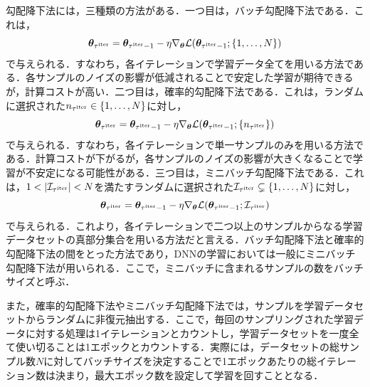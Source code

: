 \documentclass[12pt]{jarticle}
\numberwithin{equation}{section}    %
\numberwithin{figure}{section}      %
\numberwithin{table}{section}      %
\begin{document}
勾配降下法には，三種類の方法がある\cite{zhang2019gradient}．一つ目は，バッチ勾配降下法である．これは，
\begin{equation}
    \bm{\theta}_{\tau^{\text{iter}}} = \bm{\theta}_{\tau^{\text{iter}} - 1} - \eta \nabla_{\bm{\theta}} \mathcal{L}(\bm{\theta}_{\tau^{\text{iter}} - 1}; \{1, \ldots, N\})
\end{equation}
で与えられる．すなわち，各イテレーションで学習データ全てを用いる方法である．各サンプルのノイズの影響が低減されることで安定した学習が期待できるが，計算コストが高い．二つ目は，確率的勾配降下法である．これは，ランダムに選択された$n_{\tau^{\text{iter}}} \in \{1, \ldots, N\}$に対し，
\begin{equation}
    \bm{\theta}_{\tau^{\text{iter}}} = \bm{\theta}_{\tau^{\text{iter}} - 1} - \eta \nabla_{\bm{\theta}} \mathcal{L}(\bm{\theta}_{\tau^{\text{iter}} - 1}; \{n_{\tau^{\text{iter}}}\})
\end{equation}
で与えられる．すなわち，各イテレーションで単一サンプルのみを用いる方法である．計算コストが下がるが，各サンプルのノイズの影響が大きくなることで学習が不安定になる可能性がある．三つ目は，ミニバッチ勾配降下法である．これは，$1 < |\mathcal{I}_{\tau^{\text{iter}}}| < N$を満たすランダムに選択された$\mathcal{I}_{\tau^{\text{iter}}} \subsetneq \{1, \ldots, N\}$に対し，
\begin{equation}
    \bm{\theta}_{\tau^{\text{iter}}} = \bm{\theta}_{\tau^{\text{iter}} - 1} - \eta \nabla_{\bm{\theta}} \mathcal{L}(\bm{\theta}_{\tau^{\text{iter}} - 1}; \mathcal{I}_{\tau^{\text{iter}}})
\end{equation}
で与えられる．これより，各イテレーションで二つ以上のサンプルからなる学習データセットの真部分集合を用いる方法だと言える．バッチ勾配降下法と確率的勾配降下法の間をとった方法であり，DNNの学習においては一般にミニバッチ勾配降下法が用いられる．ここで，ミニバッチに含まれるサンプルの数をバッチサイズと呼ぶ．

また，確率的勾配降下法やミニバッチ勾配降下法では，サンプルを学習データセットからランダムに非復元抽出する．ここで，毎回のサンプリングされた学習データに対する処理は1イテレーションとカウントし，学習データセットを一度全て使い切ることは1エポックとカウントする．実際には，データセットの総サンプル数$N$に対してバッチサイズを決定することで1エポックあたりの総イテレーション数は決まり，最大エポック数を設定して学習を回すこととなる．
\end{document}
